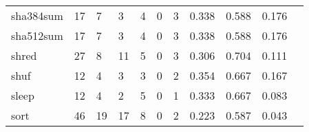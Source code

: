 \begin{longtable}{lp{1.2cm}p{1.2cm}p{1.2cm}p{1.2cm}p{1.2cm}p{1.2cm}p{1.2cm}p{1.2cm}p{1.2cm}p{1.2cm}}
sha384sum &                                    17 &                                                  7 &                                                  3 &                                                  4 &                                                  0 &                                                  3 &                                              0.338 &                                              0.588 &                                              0.176 \\
sha512sum &                                    17 &                                                  7 &                                                  3 &                                                  4 &                                                  0 &                                                  3 &                                              0.338 &                                              0.588 &                                              0.176 \\
shred     &                                    27 &                                                  8 &                                                 11 &                                                  5 &                                                  0 &                                                  3 &                                              0.306 &                                              0.704 &                                              0.111 \\
shuf      &                                    12 &                                                  4 &                                                  3 &                                                  3 &                                                  0 &                                                  2 &                                              0.354 &                                              0.667 &                                              0.167 \\
sleep     &                                    12 &                                                  4 &                                                  2 &                                                  5 &                                                  0 &                                                  1 &                                              0.333 &                                              0.667 &                                              0.083 \\
sort      &                                    46 &                                                 19 &                                                 17 &                                                  8 &                                                  0 &                                                  2 &                                              0.223 &                                              0.587 &                                              0.043 \\

\end{longtable}
